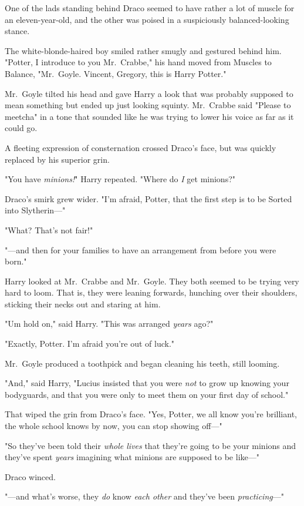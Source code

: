One of the lads standing behind Draco seemed to have rather a lot of muscle for
an eleven-year-old, and the other was poised in a suspiciously balanced-looking
stance.

The white-blonde-haired boy smiled rather smugly and gestured behind him.
"Potter, I introduce to you Mr.~Crabbe," his hand moved from Muscles to
Balance, "Mr.~Goyle. Vincent, Gregory, this is Harry Potter."

Mr.~Goyle tilted his head and gave Harry a look that was probably supposed to
mean something but ended up just looking squinty. Mr.~Crabbe said "Please to
meetcha" in a tone that sounded like he was trying to lower his voice as far as
it could go.

A fleeting expression of consternation crossed Draco's face, but was quickly
replaced by his superior grin.

"You have \emph{minions!}" Harry repeated. "Where do \emph{I} get minions?"

Draco's smirk grew wider. "I'm afraid, Potter, that the first step is to be
Sorted into Slytherin---"

"What? That's not fair!"

"---and then for your families to have an arrangement from before you were
born."

Harry looked at Mr.~Crabbe and Mr.~Goyle. They both seemed to be trying very
hard to loom. That is, they were leaning forwards, hunching over their
shoulders, sticking their necks out and staring at him.

"Um{\el} hold on," said Harry. "This was arranged \emph{years} ago?"

"Exactly, Potter. I'm afraid you're out of luck."

Mr.~Goyle produced a toothpick and began cleaning his teeth, still looming.

"And," said Harry, "Lucius insisted that you were \emph{not} to grow up knowing
your bodyguards, and that you were only to meet them on your first day of
school."

That wiped the grin from Draco's face. "Yes, Potter, we all know you're
brilliant, the whole school knows by now, you can stop showing off---"

"So they've been told their \emph{whole lives} that they're going to be your
minions and they've spent \emph{years} imagining what minions are supposed to
be like---"

Draco winced.

"---and what's worse, they \emph{do} know \emph{each other} and they've been
\emph{practicing}---"

